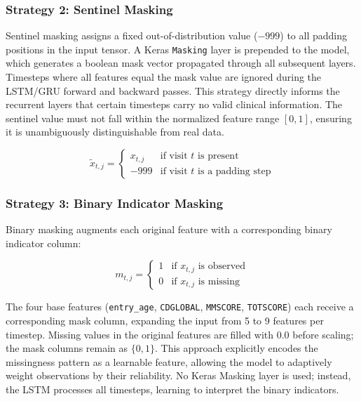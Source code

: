 \documentclass[12pt,singleside,a4paper]{article}
\begin{document}
\subsubsection{Strategy 2: Sentinel Masking}
Sentinel masking assigns a fixed out-of-distribution value ($-999$) to all padding positions in the input tensor. A Keras \texttt{Masking} layer is prepended to the model, which generates a boolean mask vector propagated through all subsequent layers. Timesteps where all features equal the mask value are ignored during the LSTM/GRU forward and backward passes. This strategy directly informs the recurrent layers that certain timesteps carry no valid clinical information. The sentinel value must not fall within the normalized feature range $[0, 1]$, ensuring it is unambiguously distinguishable from real data.

\begin{equation}
    \tilde{x}_{t,j} = \begin{cases} x_{t,j} & \text{if visit } t \text{ is present} \\ -999 & \text{if visit } t \text{ is a padding step} \end{cases}
\end{equation}

\subsubsection{Strategy 3: Binary Indicator Masking}
Binary masking augments each original feature with a corresponding binary indicator column:

\begin{equation}
    m_{t,j} = \begin{cases} 1 & \text{if } x_{t,j} \text{ is observed} \\ 0 & \text{if } x_{t,j} \text{ is missing} \end{cases}
\end{equation}

The four base features (\texttt{entry\_age}, \texttt{CDGLOBAL}, \texttt{MMSCORE}, \texttt{TOTSCORE}) each receive a corresponding mask column, expanding the input from 5 to 9 features per timestep. Missing values in the original features are filled with 0.0 before scaling; the mask columns remain as $\{0,1\}$. This approach explicitly encodes the missingness pattern as a learnable feature, allowing the model to adaptively weight observations by their reliability. No Keras Masking layer is used; instead, the LSTM processes all timesteps, learning to interpret the binary indicators.
\end{document}
